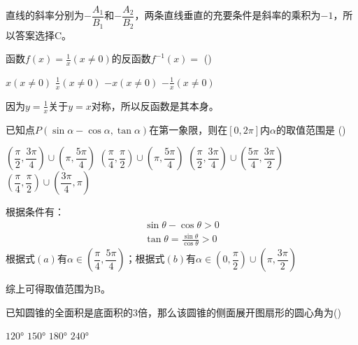 \documentclass[answers]{exam}
\begin{document}
\begin{questions}
	\begin{solution}
		直线的斜率分别为$-\dfrac{A_1}{B_1}$和$-\dfrac{A_2}{B_2}$，两条直线垂直的充要条件是斜率的乘积为$-1$，所以答案选择C。
	\end{solution}

	\question 函数$f(x)=\frac1x(x\neq0)$的反函数$f^{-1}(x)=$ \hfill (\hspace{1cm})

	\begin{oneparchoices}
		\choice $x ( x\neq0)$ \CorrectChoice $\frac1x(x\neq0)$ \choice $-x (x\neq0)$ \choice $-\frac1x (x\neq0)$
	\end{oneparchoices}
	\begin{solution}
		因为$y=\frac1x$关于$y=x$对称，所以反函数是其本身。
	\end{solution}

	\question 已知点$P(\sin\alpha-\cos\alpha, \tan\alpha)$在第一象限，则在$[0,2\pi]$内$\alpha$的取值范围是 \hfill
	(\hspace{1cm})

	\begin{choices}
		\choice $\left( \dfrac{\pi}{2}, \dfrac{3\pi}{4} \right) \cup \left( \pi, \dfrac{5\pi}{4} \right)$
		\CorrectChoice $\left( \dfrac{\pi}{4}, \dfrac{\pi}{2} \right) \cup \left( \pi, \dfrac{5\pi}{4} \right)$
		\choice $\left( \dfrac{\pi}{2}, \dfrac{3\pi}{4} \right) \cup \left( \dfrac{5\pi}{4}, \dfrac{3\pi}{2} \right)$
		\choice $\left( \dfrac{\pi}{4}, \dfrac{\pi}{2} \right) \cup \left( \dfrac{3\pi}{4}, \pi \right)$
	\end{choices}

	\begin{solution}
		根据条件有：
		\begin{align*}
			\sin\theta - \cos\theta > 0 \tag{a} \\
			\tan\theta = \frac{\sin\theta}{\cos\theta} > 0 \tag{b}
		\end{align*}
		根据式$(a)$有$\alpha \in \left( \dfrac{\pi}{4}, \dfrac{5\pi}{4} \right)$；根据式$(b)$有$\alpha \in \left( 0,
			\dfrac{\pi}{2} \right) \cup \left( \pi, \dfrac{3\pi}{2} \right)$

		综上可得取值范围为B。
	\end{solution}

	\question 已知圆锥的全面积是底面积的$3$倍，那么该圆锥的侧面展开图扇形的圆心角为\hfill (\hspace{1cm})

	\begin{oneparchoices}
		\choice $\ang{120}$
		\choice $\ang{150}$
		\choice $\ang{180}$
		\choice $\ang{240}$
	\end{oneparchoices}


\end{questions}
\end{document}
